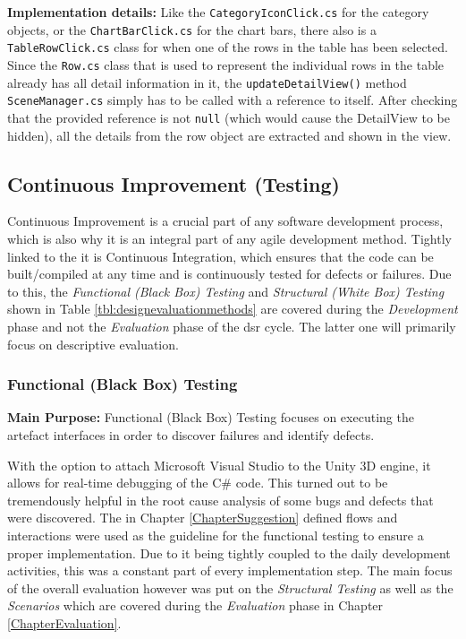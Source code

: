 \textbf{Implementation details:} Like the \texttt{CategoryIconClick.cs} for the category objects, or the \texttt{ChartBarClick.cs} for the chart bars, there also is a \texttt{TableRowClick.cs} class for when one of the rows in the table has been selected. Since the \texttt{Row.cs} class that is used to represent the individual rows in the table already has all detail information in it, the \texttt{updateDetailView()} method \texttt{SceneManager.cs} simply has to be called with a reference to itself. After checking that the provided reference is not \texttt{null} (which would cause the DetailView to be hidden), all the details from the row object are extracted and shown in the view.


\subsection{Continuous Improvement (Testing)}

Continuous Improvement is a crucial part of any software development process, which is also why it is an integral part of any agile development method. Tightly linked to the it is Continuous Integration, which ensures that the code can be built/compiled at any time and is continuously tested for defects or failures. Due to this, the \textit{Functional (Black Box) Testing} and \textit{Structural (White Box) Testing} shown in Table \ref{tbl:designevaluationmethods} are covered during the \textit{Development} phase and not the \textit{Evaluation} phase of the \gls{dsr} cycle. The latter one will primarily focus on descriptive evaluation.


\subsubsection{Functional (Black Box) Testing}

\textbf{Main Purpose:} Functional (Black Box) Testing focuses on executing the artefact interfaces in order to discover failures and identify defects.

With the option to attach Microsoft Visual Studio to the Unity 3D engine, it allows for real-time debugging of the C\# code. This turned out to be tremendously helpful in the root cause analysis of some bugs and defects that were discovered. The in Chapter \ref{ChapterSuggestion} defined flows and interactions were used as the guideline for the functional testing to ensure a proper implementation. Due to it being tightly coupled to the daily development activities, this was a constant part of every implementation step. The main focus of the overall evaluation however was put on the \textit{Structural Testing} as well as the \textit{Scenarios} which are covered during the \textit{Evaluation} phase in Chapter \ref{ChapterEvaluation}.


